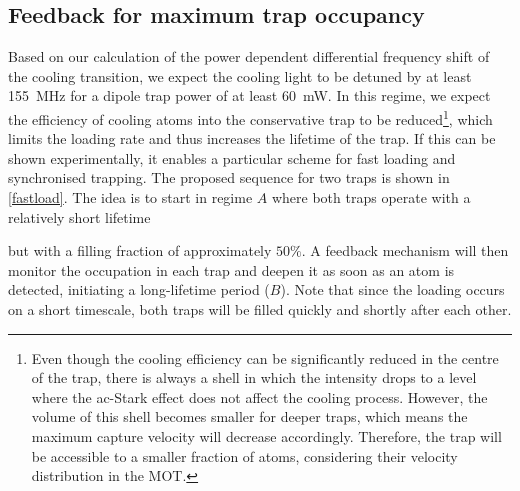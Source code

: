 \documentclass[../Thesis-IJspeert.tex]{subfiles}
\begin{document}
\subsection{Feedback for maximum trap occupancy}
Based on our calculation of the power dependent differential frequency shift of the cooling transition, we expect the cooling light to be detuned by at least \SI{155}{\mega\hertz} for a dipole trap power of at least \SI{60}{\milli\watt}. In this regime, we expect the efficiency of cooling atoms into the conservative trap to be reduced\footnote{Even though the cooling efficiency can be significantly reduced in the centre of the trap, there is always a shell in which the intensity drops to a level where the ac-Stark effect does not affect the cooling process. However, the volume of this shell becomes smaller for deeper traps, which means the maximum capture velocity will decrease accordingly. Therefore, the trap will be accessible to a smaller fraction of atoms, considering their velocity distribution in the MOT.}, which limits the loading rate and thus increases the lifetime of the trap. If this can be shown experimentally, it enables a particular scheme for fast loading and synchronised trapping. The proposed sequence for two traps is shown in \autoref{fastload}. The idea is to start in regime $A$ where both traps operate with a relatively short lifetime 

but with a filling fraction of approximately $50\%$. A feedback mechanism will then monitor the occupation in each trap and deepen it as soon as an atom is detected, initiating a long-lifetime period ($B$). Note that since the loading occurs on a short timescale, both traps will be filled quickly and shortly after each other.
\end{document}
